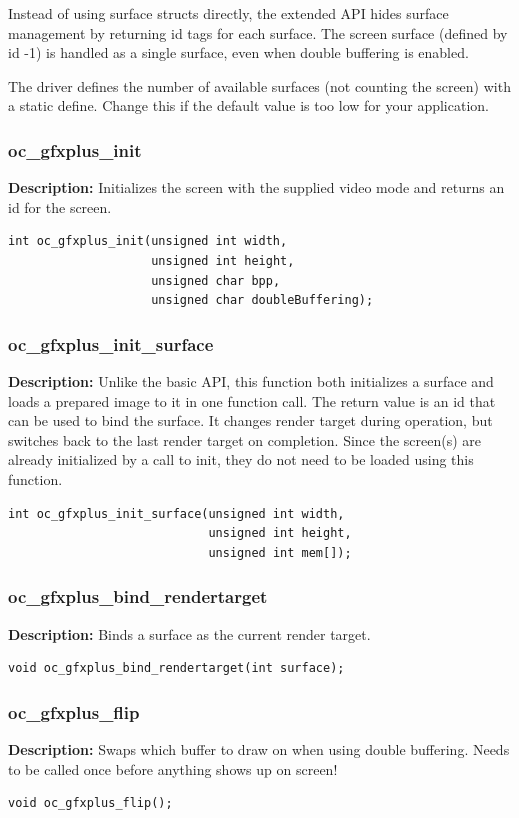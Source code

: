 \documentclass[10pt,a4paper]{article}
\begin{document}
Instead of using surface structs directly, the extended API hides surface management by returning id tags for each surface. The screen surface (defined by id -1) is handled as a single surface, even when double buffering is enabled.

The driver defines the number of available surfaces (not counting the screen) with a static define. Change this if the default value is too low for your application.

\subsubsection{oc\_gfxplus\_init}
\textbf{Description:} Initializes the screen with the supplied video mode and returns an id for the screen.
\begin{lstlisting}
int oc_gfxplus_init(unsigned int width,
                    unsigned int height,
                    unsigned char bpp,
                    unsigned char doubleBuffering);
\end{lstlisting}

\subsubsection{oc\_gfxplus\_init\_surface}
\textbf{Description:} Unlike the basic API, this function both initializes a surface and loads a prepared image to it in one function call. The return value is an id that can be used to bind the surface. It changes render target during operation, but switches back to the last render target on completion. Since the screen(s) are already initialized by a call to init, they do not need to be loaded using this function.
\begin{lstlisting}
int oc_gfxplus_init_surface(unsigned int width,
                            unsigned int height,
                            unsigned int mem[]);
\end{lstlisting}

\subsubsection{oc\_gfxplus\_bind\_rendertarget}
\textbf{Description:} Binds a surface as the current render target.
\begin{lstlisting}
void oc_gfxplus_bind_rendertarget(int surface);
\end{lstlisting}

\subsubsection{oc\_gfxplus\_flip}
\textbf{Description:} Swaps which buffer to draw on when using double buffering. Needs to be called once before anything shows up on screen!
\begin{lstlisting}
void oc_gfxplus_flip();
\end{lstlisting}
\end{document}
